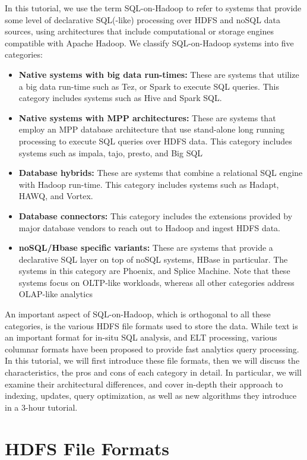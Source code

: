 \documentclass{vldb}
\begin{document}
In this tutorial, we use the term SQL-on-Hadoop to refer to systems that provide some level of declarative SQL(-like) processing over HDFS and noSQL data sources, using architectures that include computational or storage engines compatible with Apache Hadoop. We classify SQL-on-Hadoop systems into five categories:

\begin{itemize}
\item {{\bf Native systems with big data run-times:} These are systems that utilize a big data run-time such as Tez, or Spark to execute SQL queries. This category includes systems such as Hive and Spark SQL.}
\item{ {\bf Native systems with MPP architectures:} These are systems that employ an MPP database architecture that use stand-alone long running processing to execute SQL queries over HDFS data. This category includes systems such as impala, tajo, presto, and Big SQL}
\item{{\bf Database hybrids:} These are systems that combine a relational SQL engine with Hadoop run-time. This category includes systems such as Hadapt, HAWQ, and Vortex.}
\item{ {\bf Database connectors:} This category includes the extensions provided by major database vendors to reach out to Hadoop and ingest HDFS data. }
\item{ {\bf noSQL/Hbase specific variants:} These are systems that provide a declarative SQL layer on top of noSQL systems, HBase in particular. The systems in this category are Phoenix, and Splice Machine. Note that these systems focus on OLTP-like workloads, whereas all other categories address OLAP-like analytics}
\end{itemize}

An important aspect of SQL-on-Hadoop, which is orthogonal to all these categories, is the various HDFS file formats used to store the data. While text is an important format for in-situ SQL analysis, and ELT processing, various columnar formats have been proposed to provide fast analytics query processing. In this tutorial, we will first introduce these file formats, then we will discuss the characteristics, the pros and cons of each category in detail. In particular, we will examine their architectural differences, and cover in-depth their approach to indexing, updates, query optimization, as well as new algorithms they introduce in a 3-hour tutorial.

\section{HDFS File Formats}
\end{document}
